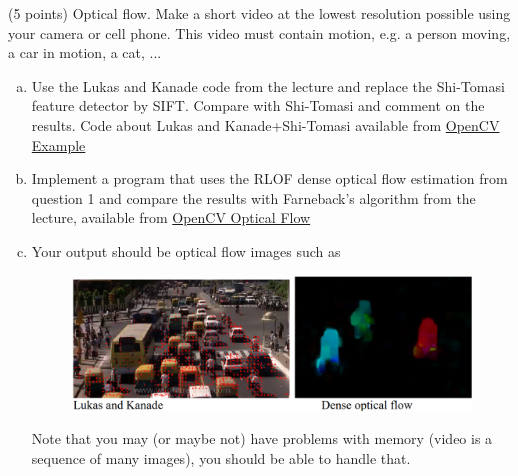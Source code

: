 \documentclass[UTF-8]{article}
\begin{document}
	
	(5 points) Optical flow. Make a short video at the lowest resolution possible using your
	camera or cell phone. This video must contain motion, e.g. a person moving, a car in
	motion, a cat, ...
	\begin{enumerate}[a.]
		\item Use the Lukas and Kanade code from the lecture and replace the Shi-Tomasi feature
		detector by SIFT. Compare with Shi-Tomasi and comment on the results. Code
		about Lukas and Kanade+Shi-Tomasi available from \href{https://docs.opencv.org/3.4/d2/d1d/samples_2cpp_2lkdemo_8cpp-example.html#a24}{OpenCV Example}
		\item Implement a program that uses the RLOF dense optical flow estimation from
		question 1 and compare the results with Farneback’s algorithm from the lecture,
		available from \href{https://docs.opencv.org/3.4/d4/dee/tutorial_optical_flow.html}{OpenCV Optical Flow}
		\item Your output should be optical flow images such as
		\begin{figure}[H]
			\centering
			\includegraphics[width=0.7\linewidth]{_images/instructions2c}
		\end{figure}
		Note that you may (or maybe not) have problems with memory (video is a sequence
		of many images), you should be able to handle that.
	\end{enumerate}
\end{document}
